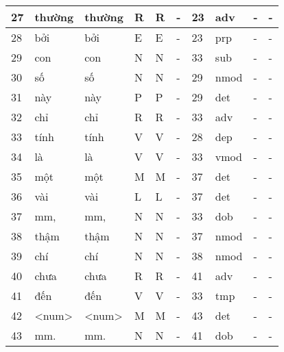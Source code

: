 \begin{tabular}{ | l | l | l | l | l | l | l | l | l | l | }
	27 & thường & thường & R & R & - & 23 & adv & - & - \\ \hline
	28 & bởi & bởi & E & E & - & 23 & prp & - & - \\ \hline
	29 & con & con & N & N & - & 33 & sub & - & - \\ \hline
	30 & số & số & N & N & - & 29 & nmod & - & - \\ \hline
	31 & này & này & P & P & - & 29 & det & - & - \\ \hline
	32 & chỉ & chỉ & R & R & - & 33 & adv & - & - \\ \hline
	33 & tính & tính & V & V & - & 28 & dep & - & - \\ \hline
	34 & là & là & V & V & - & 33 & vmod & - & - \\ \hline
	35 & một & một & M & M & - & 37 & det & - & - \\ \hline
	36 & vài & vài & L & L & - & 37 & det & - & - \\ \hline
	37 & mm, & mm, & N & N & - & 33 & dob & - & - \\ \hline
	38 & thậm & thậm & N & N & - & 37 & nmod & - & - \\ \hline
	39 & chí & chí & N & N & - & 38 & nmod & - & - \\ \hline
	40 & chưa & chưa & R & R & - & 41 & adv & - & - \\ \hline
	41 & đến & đến & V & V & - & 33 & tmp & - & - \\ \hline
	42 & <num> & <num> & M & M & - & 43 & det & - & - \\ \hline
	43 & mm. & mm. & N & N & - & 41 & dob & - & - \\ \hline
\end{tabular}
